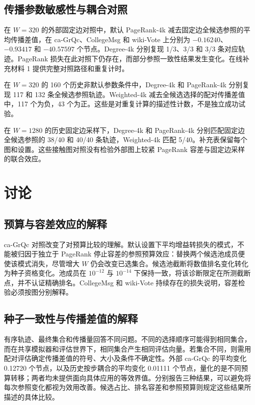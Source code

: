 \documentclass[smallextended]{svjour3}
\begin{document}
\subsection{传播参数敏感性与耦合对照}

在 $W=320$ 的外部固定边对照中，默认 PageRank-4k 减去固定边全候选参照的平均传播差值，在 ca-GrQc、CollegeMsg 和 wiki-Vote 上分别为 $-0.16240$、$-0.93417$ 和 $-40.57597$ 个节点。Degree-4k 分别复现 1/3、3/3 和 3/3 条对应轨迹。PageRank 损失在此对照下仍存在，而部分参照一致性结果发生变化。在线补充材料 1 提供完整对照路径和重复计时。

在 $W=320$ 的 160 个历史非默认参数条件中，Degree-4k 和 PageRank-4k 分别复现 117 和 132 条全候选参照轨迹。Weighted-4k 减去全候选选择的配对传播差值中，117 个为负，43 个为正。这些是对重复计算的描述性计数，不是独立成功试验。

在 $W=1280$ 的历史固定边采样下，Degree-4k 和 PageRank-4k 分别匹配固定边全候选参照的 38/40 和 40/40 条轨迹，Weighted-4k 匹配 5/40。补充表保留每个图和设置。这些接触图对照没有检验外部图上较紧 PageRank 容差与固定边采样的联合效应。
\FloatBarrier

\section{讨论}
\subsection{预算与容差效应的解释}
ca-GrQc 对照改变了对预算比较的理解。默认设置下平均增益转损失的模式，不能被归因于独立于 PageRank 停止容差的参照预算效应：替换两个候选池成员便使该模式消失，尽管增大 $W$ 仍会改变已选集合。候选池截断将数值排名变化转化为种子资格变化。池成员在 $10^{-12}$ 与 $10^{-14}$ 下保持一致，将该诊断限定在所测截断点，并不认证精确排名。CollegeMsg 和 wiki-Vote 持续存在的损失说明，容差检验必须按图分别解释。

\subsection{种子一致性与传播差值的解释}
有序轨迹、最终集合和传播量回答不同问题。不同的选择顺序可能得到相同集合，而在共享模拟器和评估世界下，相同集合产生相同评估向量。若集合不同，则需用配对评估确定传播差值的符号、大小及条件不确定性。外部 ca-GrQc 的平均变化 0.12720 个节点，以及历史按步耦合的平均变化 0.01111 个节点，量化的是不同预算转移；两者均未提供面向具体应用的等效界值。分别报告三种结果，可以避免将每次参照变化都视为效用改善。候选占比、排名容差和参照预算则规定这些结果所描述的具体比较。
\end{document}
